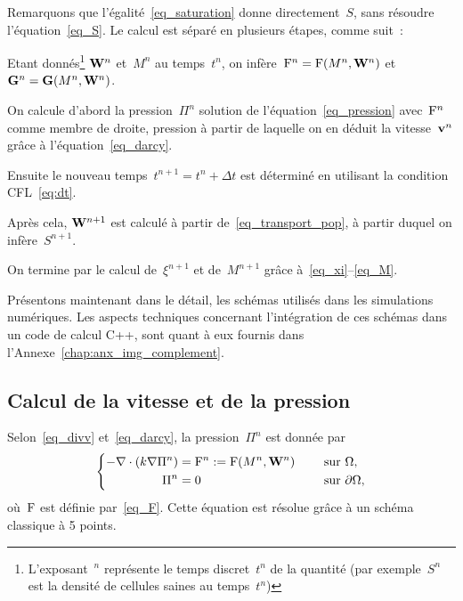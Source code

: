\documentclass[main.tex]{subfiles}
\begin{document}
Remarquons que l'égalité~\eqref{eq_saturation} donne directement~$S$, sans résoudre l'équation~\eqref{eq_S}. Le calcul est séparé en plusieurs étapes, comme suit~:
\begin{myitemize}
\item Etant donnés\footnote{L'exposant~$^n$ représente le temps discret~$t^n$ de la quantité 
(par exemple~$S^n$ est la densité de cellules saines au temps~$t^n$)}
${\bf W}^n$ et~$M^n$ au temps~$t^n$, on infère~${\rm F}^n={\rm F}(M^n,{\bf W}^n)$ et
${\bf G}^n={\bf G}(M^n,{\bf W}^n)$.
\item On calcule d'abord la pression~$\Pi^n$ solution de l'équation~\eqref{eq_pression} avec~${\rm F}^n$ comme membre de droite, pression à partir de laquelle on en  déduit la vitesse~$\mathbf{v}^n$ grâce à l'équation~\eqref{eq_darcy}.
\item Ensuite le nouveau temps~$t^{n+1}=t^n+\Delta t$ est déterminé en utilisant la condition  CFL~\eqref{eq:dt}.
\item Après cela, ${\bf W}^{n+1}$ est calculé à partir de~\eqref{eq_transport_pop}, à partir duquel on infère~$S^{n+1}$.
\item On termine par le calcul de~$\xi^{n+1}$ et de~$M^{n+1}$ grâce à~\eqref{eq_xi}--\eqref{eq_M}.
\end{myitemize}
Présentons maintenant dans le détail, les schémas utilisés dans les simulations numériques. 
Les aspects techniques concernant l'intégration de ces schémas dans un code de calcul C++, sont quant à eux fournis dans l'Annexe~\ref{chap:anx_img_complement}.

\subsection{Calcul de la vitesse et de la pression} 


Selon~\eqref{eq_divv} et~\eqref{eq_darcy}, 
la pression~$\Pi^n$ est donnée par
\begin{equation}\label{eq_pression_disc}
\left\{
\begin{aligned}
-\nabla\cdot (k\nabla \Pi^n)&={\rm F}^n:={\rm F}(M^n,{\bf W}^n) & \quad \textrm{ sur } & \Omega , \\
\Pi^n &=0 & \quad \textrm{ sur } & \partial \Omega ,
\end{aligned}
\right.
\end{equation}
où~${\rm F}$ est définie par~\eqref{eq_F}. 
Cette équation est résolue grâce à un schéma classique à 5 points. 
\end{document}

